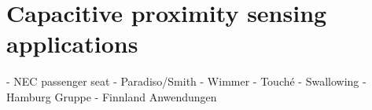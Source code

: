 \section{Capacitive proximity sensing applications}
- NEC passenger seat
- Paradiso/Smith
- Wimmer
- Touché
- Swallowing
- Hamburg Gruppe
- Finnland Anwendungen
